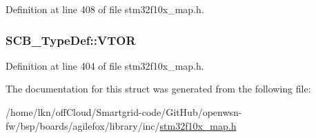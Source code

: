 Definition at line 408 of file stm32f10x\+\_\+map.\+h.

\subsubsection[{\texorpdfstring{V\+T\+OR}{VTOR}}]{ S\+C\+B\+\_\+\+Type\+Def\+::\+V\+T\+OR}\hypertarget{struct_s_c_b___type_def_adadf3af56fc57fb35feec8ca17b94328}{}\label{struct_s_c_b___type_def_adadf3af56fc57fb35feec8ca17b94328}


Definition at line 404 of file stm32f10x\+\_\+map.\+h.



The documentation for this struct was generated from the following file\+:\begin{DoxyCompactItemize}
\item 
/home/lkn/off\+Cloud/\+Smartgrid-\/code/\+Git\+Hub/openwsn-\/fw/bsp/boards/agilefox/library/inc/\hyperlink{agilefox_2library_2inc_2stm32f10x__map_8h}{stm32f10x\+\_\+map.\+h}\end{DoxyCompactItemize}
